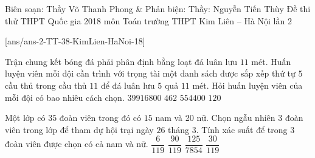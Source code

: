 \begin{name}
{Biên soạn: Thầy Võ Thanh Phong \& Phản biện: Thầy: Nguyễn Tiến Thùy}
{Đề thi thử THPT Quốc gia 2018 môn Toán trường THPT Kim Liên – Hà Nội lần 2}
\end{name}
\setcounter{ex}{0}\setcounter{bt}{0}
[ans/ans-2-TT-38-KimLien-HaNoi-18]


\begin{ex}%
	Trận chung kết bóng đá phải phân định bằng loạt đá luân lưu $11$ mét. Huấn luyện viên mỗi đội cần trình với trọng tài một danh sách được sắp xếp thứ tự $5$ cầu thủ trong cầu thủ $11$ để đá luân lưu $5$ quả $11$ mét. Hỏi huấn luyện viên của mỗi đội có bao nhiêu cách chọn.
	\choice
	{$39916800$}
	{$462$}
	{\True $554400$}
	{$120$}
\end{ex}


\begin{ex}%
	Một lớp có $35$ đoàn viên trong đó có $15$ nam và 20 nữ. Chọn ngẫu nhiên $3$ đoàn viên trong lớp để tham dự hội trại ngày $26$ tháng $3$. Tính xác suất để trong $3$ đoàn viên được chọn có cả nam và nữ.
	\choice
	{$\dfrac{6}{119}$}
	{\True $\dfrac{90}{119}$}
	{$\dfrac{125}{7854}$}
	{$\dfrac{30}{119}$}
\end{ex}


